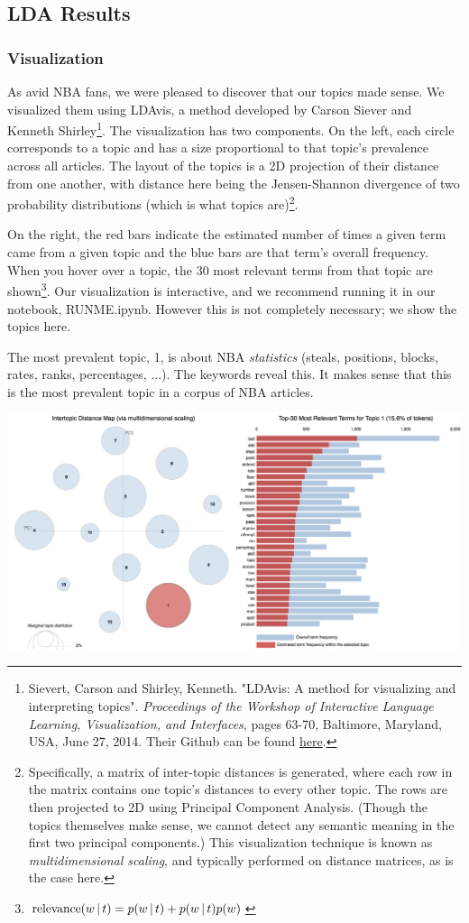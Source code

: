\documentclass[11pt]{article}
\begin{document}
\subsection{LDA Results}
\subsubsection{Visualization}
As avid NBA fans, we were pleased to discover that our topics made sense. 
We visualized them using LDAvis, a method developed by Carson Siever and Kenneth Shirley\footnote{Sievert, 
Carson and Shirley, Kenneth. "LDAvis: A method for visualizing and
interpreting topics". \textit{Proceedings of the Workshop of Interactive Language Learning,
Visualization, and Interfaces}, pages 63-70, Baltimore, Maryland, USA, June 27, 2014. 
Their Github can be found \href{https://github.com/cpsievert/LDAvis}{here}.}. 
The visualization has two components.  On the left, each circle corresponds to a topic and 
has a size  proportional to that topic's prevalence across all articles. The layout of
the topics is a 2D projection of their distance from one another, with distance here 
being the Jensen-Shannon divergence of two probability distributions (which is what 
topics are)\footnote{Specifically, a matrix of inter-topic distances is generated,
where each row in the matrix contains one topic's distances to every other topic.  
The rows are then projected to 2D using Principal Component Analysis. (Though the 
topics themselves make sense, we cannot detect any semantic meaning in the first 
two principal components.) This visualization technique is known as 
\textit{multidimensional scaling}, and typically performed on distance matrices, as is the case here.}.

On the right, the red bars indicate the estimated number of times a given term 
came from a given topic and the blue bars are that term's overall frequency. When
you hover over a topic, the 30 most relevant terms from that topic are
shown\footnote{$\text{relevance}(w\,|\, t) = p(w\,|\, t) + p(w\,|\, t)p(w)$}. Our visualization
is interactive, and we recommend running it in our notebook, RUNME.ipynb. 
However this is not completely necessary; we show the topics here. 

The most prevalent topic, 1, is about NBA \textit{statistics} 
(steals, positions, blocks, rates, ranks, percentages, ...). The keywords reveal this.  It makes sense that this is the most prevalent topic in a corpus of NBA articles. 

\includegraphics[width=470pt]{1.png} \\
\end{document}
